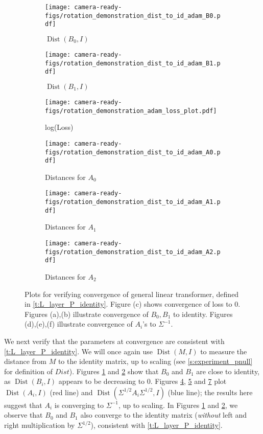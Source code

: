 \documentclass{article}
\DeclareMathOperator{\Dist}{Dist}
\begin{document}
\begin{figure}[htbp]
\centering 
\centering
\begin{subfigure}[b]{0.32\textwidth}
\centering
\texttt{[image: camera-ready-figs/rotation\_demonstration\_dist\_to\_id\_adam\_B0.pdf]}
\caption{$\Dist(B_0,I)$} 
\label{fig:B0_PQ_trend}
\end{subfigure}
\begin{subfigure}[b]{0.32\textwidth}
\centering
\texttt{[image: camera-ready-figs/rotation\_demonstration\_dist\_to\_id\_adam\_B1.pdf]}
\caption{$\Dist(B_1,I)$} 
\label{fig:B1_PQ_trend}
\end{subfigure}
\begin{subfigure}[b]{0.32\textwidth}
\centering
\texttt{[image: camera-ready-figs/rotation\_demonstration\_adam\_loss\_plot.pdf]}
\caption{log(Loss)} 
\label{fig:log_loss_PQ}
\end{subfigure}
\begin{subfigure}[b]{0.32\textwidth}
\centering
\texttt{[image: camera-ready-figs/rotation\_demonstration\_dist\_to\_id\_adam\_A0.pdf]}
\caption{Distances for $A_0$ } 
\label{fig:A0_PQ_trend}
\end{subfigure}
\begin{subfigure}[b]{0.32\textwidth}
\centering
\texttt{[image: camera-ready-figs/rotation\_demonstration\_dist\_to\_id\_adam\_A1.pdf]}
\caption{Distances for $A_1$ } 
\label{fig:A1_PQ_trend}
\end{subfigure}
\begin{subfigure}[b]{0.32\textwidth}
\centering
\texttt{[image: camera-ready-figs/rotation\_demonstration\_dist\_to\_id\_adam\_A2.pdf]}
\caption{Distances for $A_2$ } 
\label{fig:A2_PQ_trend}
\end{subfigure}  
\caption{Plots for verifying convergence of general linear transformer, defined in \autoref{t:L_layer_P_identity}. Figure (c) shows convergence of loss to $0$. Figures (a),(b) illustrate convergence of $B_0,B_1$ to identity. Figures (d),(e),(f) illustrate convergence of $A_i$'s to $\Sigma^{-1}$.}
\end{figure}

We next verify that the parameters at convergence are consistent with \autoref{t:L_layer_P_identity}. We will once again use $\Dist(M,I)$ to measure the distance from $M$ to the identity matrix, up to scaling (see \autoref{s:experiment_pnull} for definition of $Dist$). Figures \ref{fig:B0_PQ_trend} and \ref{fig:B1_PQ_trend} show that $B_0$ and $B_1$ are close to identity, as $\Dist(B_i, I)$ appears to be decreasing to 0. Figures \ref{fig:A0_PQ_trend}, \ref{fig:A1_PQ_trend} and \ref{fig:A2_PQ_trend} plot $\Dist(A_i, I)$ (red line) and $\Dist(\Sigma^{1/2} A_i \Sigma^{1/2}, I)$ (blue line); the results here suggest that $A_i$ is converging to $\Sigma^{-1}$, up to scaling. In Figures \ref{fig:B0_PQ_trend} and \ref{fig:B1_PQ_trend}, we observe that $B_0$ and $B_1$ also converge to the identity matrix (\emph{without} left and right multiplication by $\Sigma^{1/2}$), consistent with \autoref{t:L_layer_P_identity}. 
\end{document}
